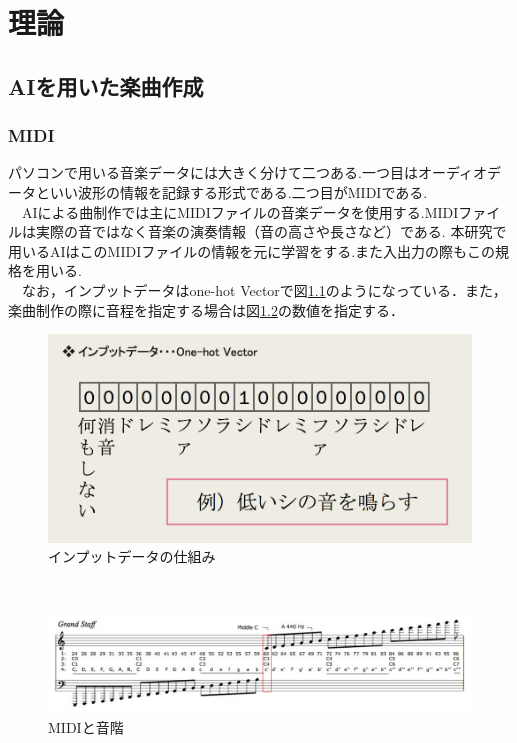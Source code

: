 \chapter{理論}
\section{AIを用いた楽曲作成}
\subsection{MIDI}
パソコンで用いる音楽データには大きく分けて二つある.一つ目はオーディオデータといい波形の情報を記録する形式である.二つ目がMIDIである.\\
　AIによる曲制作では主にMIDIファイルの音楽データを使用する.MIDIファイルは実際の音ではなく音楽の演奏情報（音の高さや長さなど）である.
本研究で用いるAIはこのMIDIファイルの情報を元に学習をする.また入出力の際もこの規格を用いる.\\
　なお，インプットデータはone-hot Vectorで図\ref{fig:インプットデータの仕組み}のようになっている．また，楽曲制作の際に音程を指定する場合は図\ref{fig:MIDIと音階}の数値を指定する．
\begin{figure}[h]
    \begin{screen}
    \begin{center}
        \includegraphics[scale=0.8,clip]{./img/midi1.png}
        \caption{インプットデータの仕組み}
        \label{fig:インプットデータの仕組み}
    \end{center}
    \end{screen}
\end{figure}\\
\newpage
\begin{figure}[h]
    \begin{screen}
    \begin{center}
        \includegraphics[scale=0.4,clip]{./img/midi2.png}
        \caption{MIDIと音階}
        \label{fig:MIDIと音階}
    \end{center}
    \end{screen}
\end{figure}
